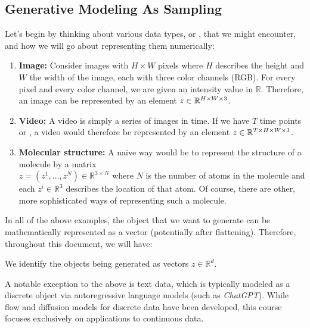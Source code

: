 \subsection{Generative Modeling As Sampling}
\label{subsec:gm_as_sampling}
Let's begin by thinking about various data types, or , that we might encounter, and how we will go about representing them numerically:
\begin{enumerate}
    \item \textbf{\sffamily Image: }Consider images with $H \times W$ pixels where $H$ describes the height and $W$ the width of the image, each with three color channels (RGB). For every pixel and every color channel, we are given an intensity value in $\mathbb{R}$. Therefore, an image can be represented by an element $z\in\mathbb{R}^{H \times W \times 3}$.
    \item \textbf{\sffamily Video: }A video is simply a series of images in time. If we have $T$ time points or , a video would therefore be represented by an element $z\in\mathbb{R}^{T\times H \times W \times 3}$.
    \item \textbf{\sffamily Molecular structure: }A naive way would be to represent the structure of a molecule by a matrix \\$z=(z^1,\dots,z^N)\in\mathbb{R}^{3\times N}$ where $N$ is the number of atoms in the molecule and each $z^i\in\mathbb{R}^3$ describes the location of that atom. Of course, there are other, more sophisticated ways of representing such a molecule.
\end{enumerate}
In all of the above examples, the object that we want to generate can be mathematically represented as a vector (potentially after flattening). Therefore, throughout this document, we will have:
\begin{ideabox}
    We identify the objects being generated as vectors $z \in \mathbb{R}^d$.
\end{ideabox}
A notable exception to the above is text data, which is typically modeled as a discrete object via autoregressive language models (such as \emph{ChatGPT}). While flow and diffusion models for discrete data have been developed, this course focuses exclusively on applications to continuous data.



